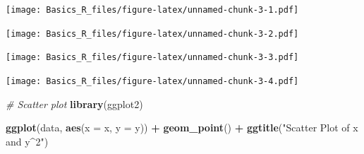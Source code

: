 \documentclass[
]{article}
\newenvironment{Shaded}{\begin{snugshade}}{\end{snugshade}}
\newcommand{\CommentTok}[1]{\textcolor[rgb]{0.56,0.35,0.01}{\textit{#1}}}
\newcommand{\DataTypeTok}[1]{\textcolor[rgb]{0.13,0.29,0.53}{#1}}
\newcommand{\KeywordTok}[1]{\textcolor[rgb]{0.13,0.29,0.53}{\textbf{#1}}}
\newcommand{\NormalTok}[1]{#1}
\newcommand{\OperatorTok}[1]{\textcolor[rgb]{0.81,0.36,0.00}{\textbf{#1}}}
\newcommand{\StringTok}[1]{\textcolor[rgb]{0.31,0.60,0.02}{#1}}
\begin{document}
\texttt{[image: Basics\_R\_files/figure-latex/unnamed-chunk-3-1.pdf]}

\begin{Shaded}
\end{Shaded}

\texttt{[image: Basics\_R\_files/figure-latex/unnamed-chunk-3-2.pdf]}

\begin{Shaded}
\end{Shaded}

\texttt{[image: Basics\_R\_files/figure-latex/unnamed-chunk-3-3.pdf]}

\begin{Shaded}
\end{Shaded}

\texttt{[image: Basics\_R\_files/figure-latex/unnamed-chunk-3-4.pdf]}

\begin{Shaded}
\begin{Highlighting}[]
\CommentTok{# Scatter plot}
\KeywordTok{library}\NormalTok{(ggplot2)}

\KeywordTok{ggplot}\NormalTok{(data, }\KeywordTok{aes}\NormalTok{(}\DataTypeTok{x =}\NormalTok{ x, }\DataTypeTok{y =}\NormalTok{ y)) }\OperatorTok{+}
\StringTok{  }\KeywordTok{geom_point}\NormalTok{() }\OperatorTok{+}
\StringTok{  }\KeywordTok{ggtitle}\NormalTok{(}\StringTok{"Scatter Plot of x and y^2"}\NormalTok{)}
\end{Highlighting}
\end{Shaded}
\end{document}

